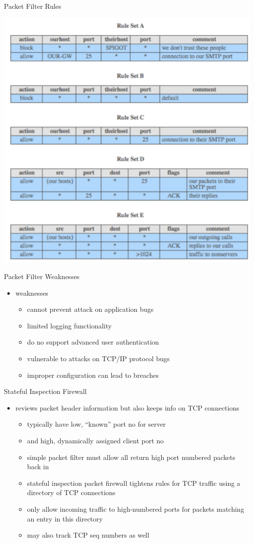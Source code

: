 \documentclass{beamer}
\begin{document}
\begin{frame}{Packet Filter Rules}
  \begin{center}
    \includegraphics[width=0.6\linewidth]{filter-rules}
  \end{center}
\end{frame}

\begin{frame}{Packet Filter Weaknesses}
  \begin{itemize}
  \item weaknesses 
    \begin{itemize}
    \item cannot prevent attack on application bugs 
    \item limited logging functionality 
    \item do no support advanced user authentication 
    \item vulnerable to attacks on TCP/IP protocol bugs 
    \item improper configuration can lead to breaches
    \end{itemize}
  \end{itemize}
\end{frame}

\begin{frame}{Stateful Inspection Firewall}
  \begin{itemize}
  \item reviews packet header information but also keeps 
    info on TCP connections 
    \begin{itemize}
    \item typically have low, “known” port no for server 
    \item and high, dynamically assigned client port no 
    \item simple packet filter must allow all return high port 
      numbered packets back in 
    \item stateful inspection packet firewall tightens rules for TCP 
      traffic using a directory of TCP connections 
    \item only allow incoming traffic to high-numbered ports for 
      packets matching an entry in this directory 
    \item may also track TCP seq numbers as well
    \end{itemize}
  \end{itemize}
\end{frame}
\end{document}
